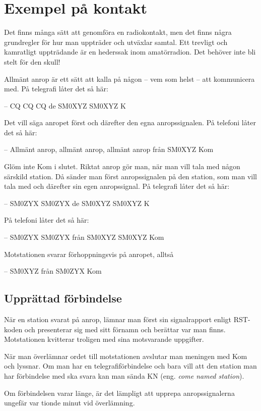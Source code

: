 \newpage
\section{Exempel på kontakt}

Det finns många sätt att genomföra en radiokontakt, men det finns några
grundregler för hur man uppträder och utväxlar samtal.
Ett trevligt och kamratligt uppträdande är en hederssak inom amatörradion.
Det behöver inte bli stelt för den skull!

Allmänt anrop är ett sätt att kalla på någon
-- vem som helst -- att kommunicera med.
På telegrafi låter det så här:

-- CQ CQ CQ de SM0XYZ SM0XYZ K

Det vill säga anropet först och därefter den egna anropssignalen.
På telefoni låter det så här:

-- Allmänt anrop, allmänt anrop, allmänt anrop från SM0XYZ Kom

Glöm inte Kom i slutet.
Riktat anrop gör man, när man vill tala med någon särskild station.
Då sänder man först anropssignalen på den station, som man vill tala med och
därefter sin egen anropssignal.
På telegrafi låter det så här:

-- SM0ZYX SM0ZYX de SM0XYZ SM0XYZ K

På telefoni låter det så här:

-- SM0ZYX SM0ZYX från SM0XYZ SM0XYZ Kom

Motstationen svarar förhoppningsvis på anropet, alltså

-- SM0XYZ från SM0ZYX Kom

\subsection{Upprättad förbindelse}

När en station svarat på anrop, lämnar man först sin signalrapport enligt
RST-koden och presenterar sig med sitt förnamn och berättar var man finns.
Motstationen kvitterar troligen med sina motsvarande uppgifter.

När man överlämnar ordet till motstationen avslutar man meningen med Kom och
lyssnar.
Om man har en telegrafiförbindelse och bara vill att den station man har
förbindelse med ska svara kan man sända KN (eng. \emph{come named station}).

Om förbindelsen varar länge, är det lämpligt att upprepa anropssignalerna
ungefär var tionde minut vid överlämning.

